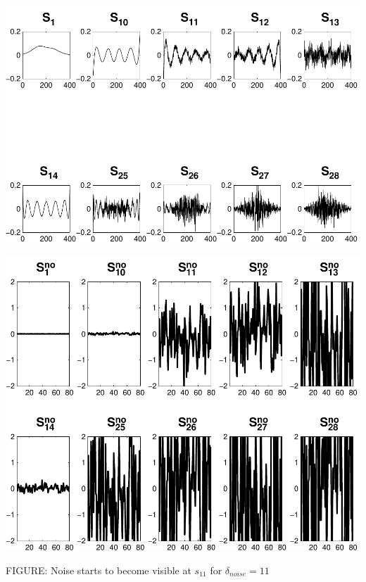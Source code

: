 \documentclass[11pt]{amsart}
\begin{document}
	
	
	\vspace{5mm}
	\begin{minipage}[t]{0.5\textwidth}
	
		\includegraphics[width=.95\linewidth]{figures/run2/sk_plots} 
   
	\end{minipage}
	\begin{minipage}[t]{0.5\textwidth}
	
		\includegraphics[width=.75\linewidth]{figures/run2/noise_parts} 
   
	\end{minipage}
	\begin{center}
		FIGURE: 
		Noise starts to become visible at $s_{11}$ for $\delta_{noise}=11$
	\end{center} 
	\vspace{5mm}
	
\end{document}
